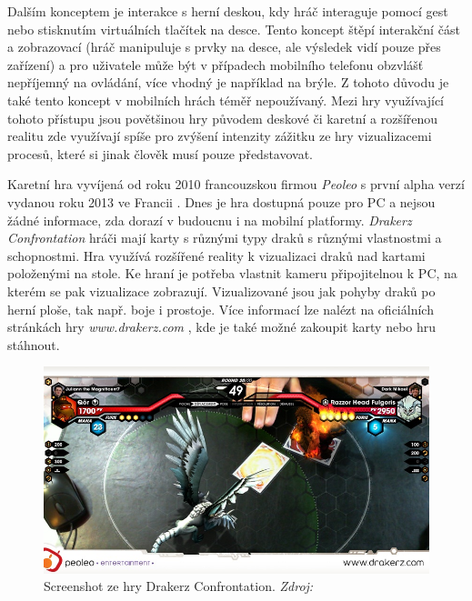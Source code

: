 \documentclass[twoside,12pt]{article}
\begin{document}
Dalším konceptem je interakce s herní deskou, kdy hráč interaguje pomocí gest nebo stisknutím virtuálních tlačítek na desce. Tento koncept štěpí interakční část a zobrazovací (hráč manipuluje s prvky na desce, ale výsledek vidí pouze přes zařízení) a pro uživatele může být v případech mobilního telefonu obzvlášť nepříjemný na ovládání, více vhodný je například na brýle. Z tohoto důvodu je také tento koncept v mobilních hrách téměř nepoužívaný. Mezi hry využívající tohoto přístupu jsou povětšinou hry původem deskové či karetní a rozšířenou realitu zde využívají spíše pro zvýšení intenzity zážitku ze hry vizualizacemi procesů, které si jinak člověk musí pouze představovat. 

%
%

Karetní hra vyvíjená od roku 2010 francouzskou firmou \textit{Peoleo} s první alpha verzí vydanou roku 2013 ve Francii \cite{venturebeat}. Dnes je hra dostupná pouze pro PC a nejsou žádné informace, zda dorazí v budoucnu i na mobilní platformy. \textit{Drakerz Confrontation} hráči mají karty s různými typy draků s různými vlastnostmi a schopnostmi. Hra využívá rozšířené reality k vizualizaci draků nad kartami položenými na stole. Ke hraní je potřeba vlastnit kameru připojitelnou k PC, na kterém se pak vizualizace zobrazují. Vizualizované jsou jak pohyby draků po herní ploše, tak např. boje i prostoje. Více informací lze nalézt na oficiálních stránkách hry \textit{www.drakerz.com} \cite{peoleo_about}, kde je také možné zakoupit karty nebo hru stáhnout.


\begin{figure}[H]
    \includegraphics[width=424px, center]{images/drakerz-confrontation.jpg}
    \caption[]{Screenshot ze hry Drakerz Confrontation. \textit{Zdroj: \cite{drakerz_screenshot} }}
    \label{drakerz_screenshot}
\end{figure}
\end{document}
